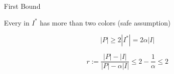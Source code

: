 \begin{frame}{First Bound}

Every \pack{} in $I^*$ has more than two colors
(safe assumption)

\pause
\begin{observation}
$$ |P| \geq 2 |I^*| = 2 \alpha |I| $$
\end{observation}

\pause
\begin{corollary}
$$r := \frac{|P| - |I|}{|P| - \alpha |I|} \leq 2 - \frac{1}{\alpha} \leq 2$$
\end{corollary}


\end{frame}

